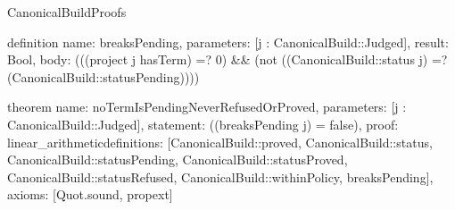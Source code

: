 \begin{lexlean}{CanonicalBuildProofs}
\begin{semanticmodule}
definition{
  name: breaksPending,
  parameters: [j : CanonicalBuild::Judged],
  result: Bool,
  body: (((project j hasTerm) =? 0) && (not ((CanonicalBuild::status j) =? (CanonicalBuild::statusPending))))
}

theorem{
  name: noTermIsPendingNeverRefusedOrProved,
  parameters: [j : CanonicalBuild::Judged],
  statement: ((breaksPending j) = false),
  proof: linear_arithmetic{definitions: [CanonicalBuild::proved, CanonicalBuild::status, CanonicalBuild::statusPending, CanonicalBuild::statusProved, CanonicalBuild::statusRefused, CanonicalBuild::withinPolicy, breaksPending]},
  axioms: [Quot.sound, propext]
}
\end{semanticmodule}
\end{lexlean}
